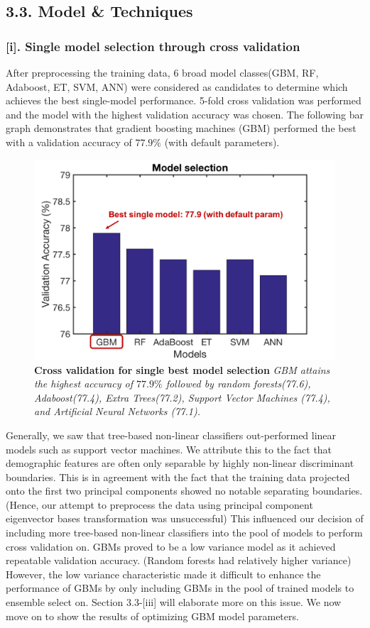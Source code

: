 \subsection*{3.3. Model \& Techniques}
\subsubsection*{[i]. Single model selection through cross validation}
After preprocessing the training data, 6 broad model classes(GBM, RF, Adaboost, ET, SVM, ANN) were considered as candidates to determine which achieves the best single-model performance. 5-fold cross validation was performed and the model with the highest validation accuracy was chosen. The following bar graph demonstrates that gradient boosting machines (GBM) performed the best with a validation accuracy of $77.9\%$ (with default parameters).
\begin{figure}[h]
\center
\includegraphics[scale=0.45]{figure2/figure2.png}
\caption{\textbf{Cross validation for single best model selection} \textit{GBM attains the highest accuracy of $77.9\%$ followed by random forests(77.6), Adaboost(77.4), Extra Trees(77.2), Support Vector Machines (77.4), and Artificial Neural Networks (77.1).}}
\end{figure}

Generally, we saw that tree-based non-linear classifiers out-performed linear models such as support vector machines. We attribute this to the fact that demographic features are often only separable by highly non-linear discriminant boundaries. This is in agreement with the fact that the training data projected onto the first two principal components showed no notable separating boundaries. (Hence, our attempt to preprocess the data using principal component eigenvector bases transformation was unsuccessful) This influenced our decision of including more tree-based non-linear classifiers into the pool of models to perform cross validation on. GBMs proved to be a low variance model as it achieved repeatable validation accuracy. (Random forests had relatively higher variance) However, the low variance characteristic made it difficult to enhance the performance of GBMs by only including GBMs in the pool of trained models to ensemble select on. Section 3.3-[iii] will elaborate more on this issue. We now move on to show the results of optimizing GBM model parameters.

